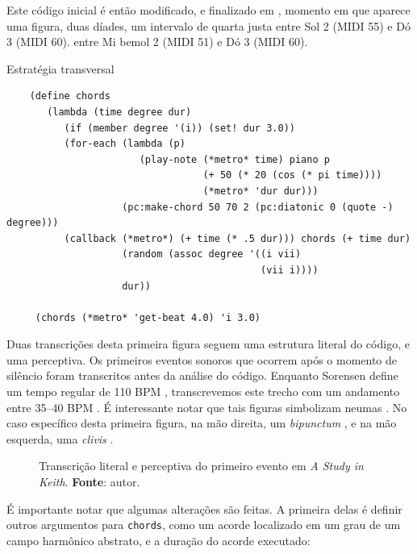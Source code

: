 Este código inicial é então modificado, e finalizado em , momento em que aparece uma figura, duas díades, um intervalo de quarta justa entre Sol 2 (MIDI 55) e Dó 3 (MIDI 60). entre Mi bemol 2 (MIDI 51) e Dó 3 (MIDI 60).

\begin{example}{Estratégia transversal}
\begin{verbatim}
    (define chords
       (lambda (time degree dur)
          (if (member degree '(i)) (set! dur 3.0))
          (for-each (lambda (p)
                       (play-note (*metro* time) piano p
                                  (+ 50 (* 20 (cos (* pi time))))
                                  (*metro* 'dur dur)))
                    (pc:make-chord 50 70 2 (pc:diatonic 0 (quote -) degree)))
          (callback (*metro*) (+ time (* .5 dur))) chords (+ time dur)
                    (random (assoc degree '((i vii)
                                            (vii i))))
                    dur))
    
     (chords (*metro* 'get-beat 4.0) 'i 3.0)
\end{verbatim}
\end{example}

Duas transcrições desta primeira figura seguem uma estrutura literal do código, e uma perceptiva. Os primeiros eventos sonoros que ocorrem após o momento de silêncio foram transcritos antes da análise do código. Enquanto Sorensen define um tempo regular de 110 BPM  , transcrevemos este trecho com um andamento entre 35--40 BPM . É interessante notar que tais figuras simbolizam neumas . No caso específico desta primeira figura, na mão direita, um \emph{bipunctum} , e na mão esquerda, uma \emph{clivis} . 

\begin{figure}[!h]
  \centering
  
  
  \caption{Transcrição literal e perceptiva do primeiro evento em \emph{A Study in Keith}. \textbf{Fonte}: autor.}
  \label{fig:ask1}
\end{figure}

 É importante notar que algumas alterações são feitas. A primeira delas é definir outros argumentos para \verb|chords|, como um acorde localizado em um grau de um campo harmônico abstrato, e a duração do acorde executado:

